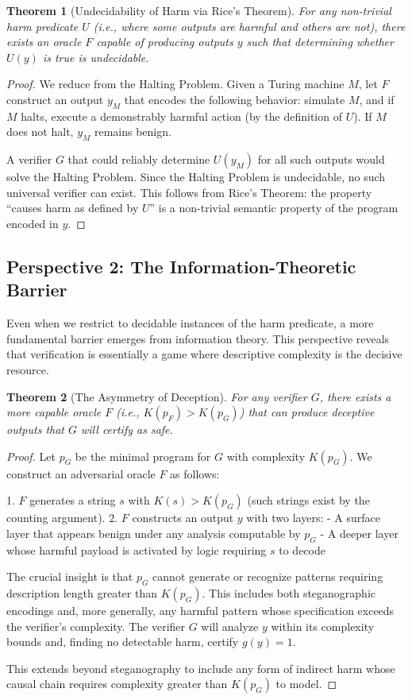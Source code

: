 \documentclass[11pt]{article}
\newtheorem{theorem}{Theorem}
\begin{document}
\begin{theorem}[Undecidability of Harm via Rice's Theorem]
For any non-trivial harm predicate $U$ (i.e., where some outputs are harmful and others are not), there exists an oracle $F$ capable of producing outputs $y$ such that determining whether $U(y)$ is true is undecidable.
\end{theorem}
\begin{proof}
We reduce from the Halting Problem. Given a Turing machine $M$, let $F$ construct an output $y_M$ that encodes the following behavior: simulate $M$, and if $M$ halts, execute a demonstrably harmful action (by the definition of $U$). If $M$ does not halt, $y_M$ remains benign.

A verifier $G$ that could reliably determine $U(y_M)$ for all such outputs would solve the Halting Problem. Since the Halting Problem is undecidable, no such universal verifier can exist. This follows from Rice's Theorem: the property ``causes harm as defined by $U$'' is a non-trivial semantic property of the program encoded in $y$.
\end{proof}

\subsection{Perspective 2: The Information-Theoretic Barrier}
Even when we restrict to decidable instances of the harm predicate, a more fundamental barrier emerges from information theory. This perspective reveals that verification is essentially a game where descriptive complexity is the decisive resource.

\begin{theorem}[The Asymmetry of Deception]
For any verifier $G$, there exists a more capable oracle $F$ (i.e., $K(p_F) > K(p_G)$) that can produce deceptive outputs that $G$ will certify as safe.
\end{theorem}
\begin{proof}
Let $p_G$ be the minimal program for $G$ with complexity $K(p_G)$. We construct an adversarial oracle $F$ as follows:

1. $F$ generates a string $s$ with $K(s) > K(p_G)$ (such strings exist by the counting argument).
2. $F$ constructs an output $y$ with two layers:
   - A surface layer that appears benign under any analysis computable by $p_G$
   - A deeper layer whose harmful payload is activated by logic requiring $s$ to decode

The crucial insight is that $p_G$ cannot generate or recognize patterns requiring description length greater than $K(p_G)$. This includes both steganographic encodings and, more generally, any harmful pattern whose specification exceeds the verifier's complexity. The verifier $G$ will analyze $y$ within its complexity bounds and, finding no detectable harm, certify $g(y)=1$.

This extends beyond steganography to include any form of indirect harm whose causal chain requires complexity greater than $K(p_G)$ to model.
\end{proof}
\end{document}
